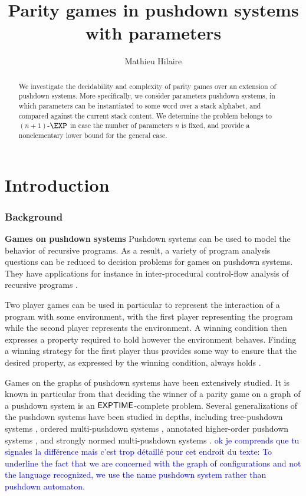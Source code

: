 \documentclass[a4paper,UKenglish,cleveref, autoref, thm-restate]{lipics-v2021}
\title{Parity games in pushdown systems with parameters}
\author{Mathieu Hilaire}{Université Paris-Saclay,
CNRS,
ENS Paris-Saclay,
LMF,
Gif-sur-Yvette, France
}{hilaire@lsv.fr}{}{This work was partly done while the author was supported by the 
Agence Nationale de la Recherche grant no.  ANR-17-CE40-0010.}
\begin{document}
\maketitle


\begin{abstract}
	We investigate the decidability and complexity of
	parity games over an extension of pushdown systems.
	More specifically, we consider parameters pushdown systems, in
	which parameters can be instantiated to some word over a stack alphabet,
	and compared against the current stack content.
	We determine the problem
	belongs to $(n+1)$-$\EXP$ in case the number of parameters
$n$ is fixed, and provide a nonelementary lower bound for the general case. 
\end{abstract}

\section{Introduction}

\subsubsection*{Background}




{\bf Games on pushdown systems} Pushdown systems can be used to model the behavior of recursive programs.
As a result, a variety of 
 program analysis questions can be reduced to decision problems for games on pushdown systems.
They have applications for instance in inter-procedural control-flow analysis of recursive programs \cite{esparza1999automata, reps2005weighted}.





Two player games can be used in particular to
 represent the
interaction of a program with some environment, with the first player representing the program while the second player represents the environment. A winning condition then expresses a property required to hold however the environment behaves. Finding a winning strategy for the first player
thus provides some way 
 to ensure that the desired 
property, as expressed by the winning condition,
always holds \cite{arnold2003games}.


Games on the graphs of pushdown systems have been extensively studied.
It is known in particular from \cite{walukiewicz1996pushdown} that deciding the winner of a parity game on a graph of a pushdown system is an ${\sf EXPTIME}$-complete problem.
Several generalizations of the pushdown systems 
have been studied in depths, including
tree-pushdown systems \cite{guessarian1983pushdown}, ordered
multi-pushdown systems \cite{breveglieri1996multi, atig2012model}, annotated higher-order pushdown systems \cite{maslov1976multilevel, broadbent2012saturation}, and
strongly normed multi-pushdown systems \cite{czerwinski2012reachability}.
\textcolor{blue}{ok je comprends que tu signales la différence mais c'est trop détaillé pour cet endroit du texte: To underline the fact that we are concerned with the graph of configurations and not the language recognized, we use the name pushdown system rather than pushdown automaton.}
\end{document}
